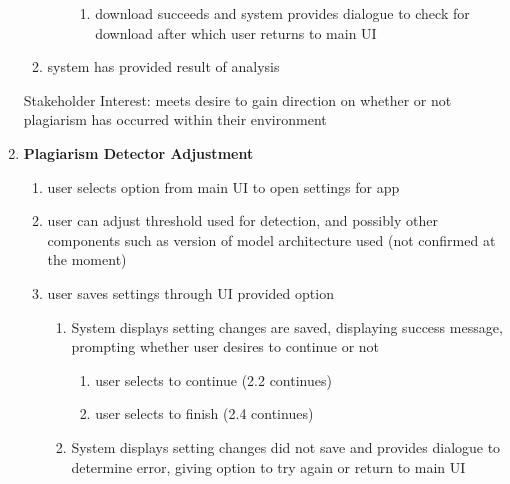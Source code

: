 \documentclass[12pt]{article}
\begin{document}
\begin{enumerate}
\begin{enumerate}
\begin{enumerate}
\begin{enumerate}
                \item download succeeds and system provides dialogue to check for download after which user returns to main UI

            \end{enumerate}
        \end{enumerate}
        
        \item system has provided result of analysis
        
    \end{enumerate}

    Stakeholder Interest: meets desire to gain direction on whether or not plagiarism has occurred within their environment

    \newpage

    \item \textbf{Plagiarism Detector Adjustment}

    \begin{enumerate}
        \item user selects option from main UI to open settings for app

        \item user can adjust threshold used for detection, and possibly other components such as version of model architecture used (not confirmed at the moment)

        \item user saves settings through UI provided option

        \begin{enumerate}

            \item System displays setting changes are saved, displaying success message, prompting whether user desires to continue or not

            \begin{enumerate}

                \item user selects to continue (2.2 continues)

                \item user selects to finish (2.4 continues)

            \end{enumerate}

            \item System displays setting changes did not save and provides dialogue to determine error, giving option to try again or return to main UI 


\end{enumerate}
\end{enumerate}
\end{enumerate}
\end{document}
